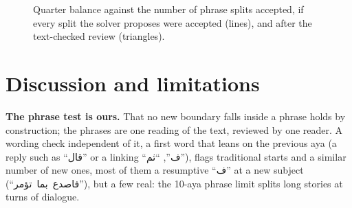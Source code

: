 \documentclass[conference]{IEEEtran}
\newcommand{\ar}[1]{\mbox{\textarabic{#1}}}
\begin{document}
\begin{figure}[t]
\centering
{}
\caption{Quarter balance against the number of phrase splits accepted, if every split the
solver proposes were accepted (lines), and after the text-checked review (triangles).}
\label{fig:curve}
\end{figure}

\section{Discussion and limitations}
\textbf{The phrase test is ours.} That no new boundary falls inside a phrase holds by
construction; the phrases are one reading of the text, reviewed by one reader. A wording check independent
of it, a first word that leans on the previous aya (a reply such as ``\ar{قال}'' or a linking
``\ar{ف}'', ``\ar{ثم}''), flags \TradLeaning{} traditional starts and a similar number of new ones,
most of them a resumptive ``\ar{ف}'' at a new subject (``\ar{فاصدع بما تؤمر}''), but a few real: the
10-aya phrase limit splits long stories at turns of dialogue.
\end{document}
